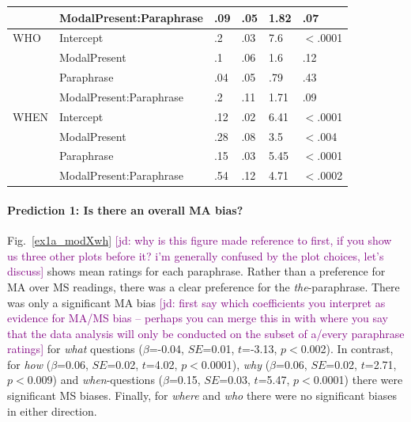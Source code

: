 \documentclass[12pt,letterpaper,table,svgnames,dvipsnames]{article}
\newcommand{\jd}[1]{\textcolor{Purple}{[jd: #1]}}
\newcommand{\figref}[1]{Fig.~\ref{#1}}
\begin{document}
\begin{table}[p!]
\begin{center}
\begin{tabular}{l|lllll}
{} & ModalPresent:Paraphrase & .09 & .05 & 1.82 & .07\\
\bottomrule
\toprule
WHO & Intercept & .2 & .03 & 7.6 & $<$.0001\\
{} & ModalPresent & .1 & .06 & 1.6 & .12\\
{} & Paraphrase & .04 & .05 & .79 & .43\\
{} & ModalPresent:Paraphrase & .2 & .11 & 1.71 & .09\\
\bottomrule
\toprule
WHEN & Intercept & .12 & .02 & 6.41 & $<$.0001\\
{} & ModalPresent & .28 & .08 & 3.5 & $<$.004\\
{} & Paraphrase & .15 & .03 & 5.45 & $<$.0001\\
{} & ModalPresent:Paraphrase & .54 & .12 & 4.71 & $<$.0002\\
\bottomrule
\end{tabular} 
\end{center} 
\end{table}






\paragraph{Prediction 1: Is there an overall MA bias?} 
\figref{ex1a_modXwh} \jd{why is this figure made reference to first, if you show us three other plots before it? i'm generally confused by the plot choices, let's discuss} shows mean ratings for each paraphrase. Rather than a preference for MA over MS readings, there was a clear preference for the \emph{the}-paraphrase. There was only a significant MA bias \jd{first say which coefficients you interpret as evidence for MA/MS bias -- perhaps you can merge this in with where you say that the data analysis will only be conducted on the subset of a/every paraphrase ratings} for \emph{what} questions ($\beta$=-0.04, $SE$=0.01, $t$=-3.13, $p<$0.002). In contrast, for \emph{how} ($\beta$=0.06, $SE$=0.02, $t$=4.02, $p<$0.0001), \emph{why} ($\beta$=0.06, $SE$=0.02, $t$=2.71, $p<$0.009) and \emph{when}-questions ($\beta$=0.15, $SE$=0.03, $t$=5.47, $p<$0.0001) there were significant MS biases. Finally, for \emph{where} and \emph{who} there were no significant biases in either direction. 
\end{document}
